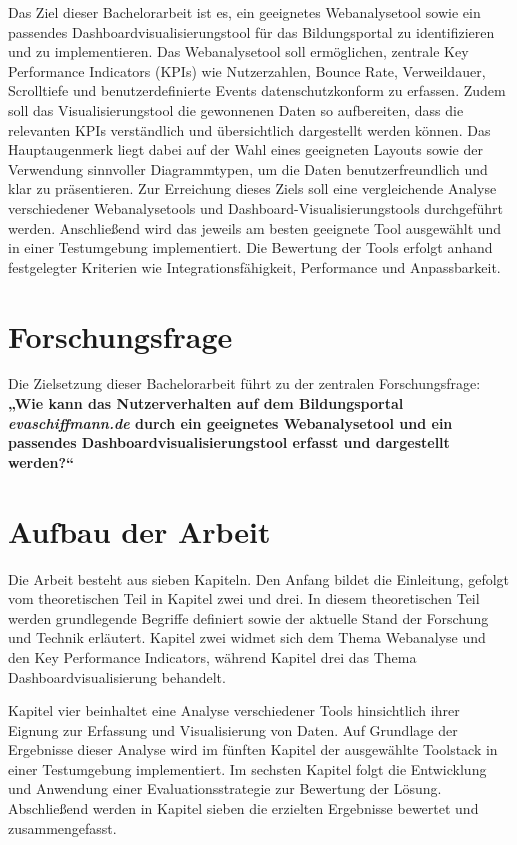 Das Ziel dieser Bachelorarbeit ist es, ein geeignetes Webanalysetool sowie ein passendes Dashboardvisualisierungstool für das Bildungsportal zu identifizieren und zu implementieren. Das Webanalysetool soll ermöglichen, zentrale Key Performance Indicators (KPIs) wie Nutzerzahlen, Bounce Rate, Verweildauer, Scrolltiefe und benutzerdefinierte Events datenschutzkonform zu erfassen. Zudem soll das Visualisierungstool die gewonnenen Daten so aufbereiten, dass die relevanten KPIs verständlich und übersichtlich dargestellt werden können. Das Hauptaugenmerk liegt dabei auf der Wahl eines geeigneten Layouts sowie der Verwendung sinnvoller Diagrammtypen, um die Daten benutzerfreundlich und klar zu präsentieren.
Zur Erreichung dieses Ziels soll eine vergleichende Analyse verschiedener Webanalysetools und Dashboard-Visualisierungstools durchgeführt werden. Anschließend wird das jeweils am besten geeignete Tool ausgewählt und in einer Testumgebung implementiert. Die Bewertung der Tools erfolgt anhand festgelegter Kriterien wie Integrationsfähigkeit, Performance und Anpassbarkeit.

\section{Forschungsfrage}
\label{sec:forschungsfrage}
Die Zielsetzung dieser Bachelorarbeit führt zu der zentralen Forschungsfrage:
\textbf{„Wie kann das Nutzerverhalten auf dem Bildungsportal \textit{evaschiffmann.de} durch ein geeignetes Webanalysetool und ein passendes Dashboardvisualisierungstool erfasst und dargestellt werden?“}

\section{Aufbau der Arbeit}
\label{sec:aufbau}
Die Arbeit besteht aus sieben Kapiteln. Den Anfang bildet die Einleitung, gefolgt vom theoretischen Teil in Kapitel zwei und drei. In diesem theoretischen Teil werden grundlegende Begriffe definiert sowie der aktuelle Stand der Forschung und Technik erläutert. Kapitel zwei widmet sich dem Thema Webanalyse und den Key Performance Indicators, während Kapitel drei das Thema Dashboardvisualisierung behandelt.

Kapitel vier beinhaltet eine Analyse verschiedener Tools hinsichtlich ihrer Eignung zur Erfassung und Visualisierung von Daten. Auf Grundlage der Ergebnisse dieser Analyse wird im fünften Kapitel der ausgewählte Toolstack in einer Testumgebung implementiert. Im sechsten Kapitel folgt die Entwicklung und Anwendung einer Evaluationsstrategie zur Bewertung der Lösung. Abschließend werden in Kapitel sieben die erzielten Ergebnisse bewertet und zusammengefasst.